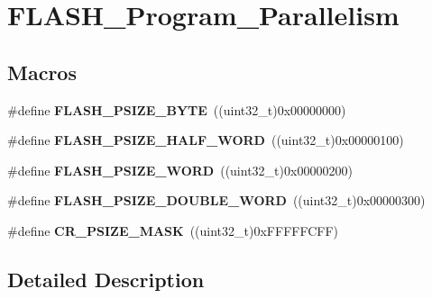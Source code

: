 \hypertarget{group___f_l_a_s_h___program___parallelism}{}\section{F\+L\+A\+S\+H\+\_\+\+Program\+\_\+\+Parallelism}
\label{group___f_l_a_s_h___program___parallelism}
\subsection*{Macros}
\begin{DoxyCompactItemize}
\item 
\hypertarget{group___f_l_a_s_h___program___parallelism_ga83c67710aa697216193654e1e90cc953}{}\#define {\bfseries F\+L\+A\+S\+H\+\_\+\+P\+S\+I\+Z\+E\+\_\+\+B\+Y\+T\+E}~((uint32\+\_\+t)0x00000000)\label{group___f_l_a_s_h___program___parallelism_ga83c67710aa697216193654e1e90cc953}

\item 
\hypertarget{group___f_l_a_s_h___program___parallelism_gad3210ba7423b45cb3063f4294cdeab16}{}\#define {\bfseries F\+L\+A\+S\+H\+\_\+\+P\+S\+I\+Z\+E\+\_\+\+H\+A\+L\+F\+\_\+\+W\+O\+R\+D}~((uint32\+\_\+t)0x00000100)\label{group___f_l_a_s_h___program___parallelism_gad3210ba7423b45cb3063f4294cdeab16}

\item 
\hypertarget{group___f_l_a_s_h___program___parallelism_gac3ac337ed43efc869a9f734527e44673}{}\#define {\bfseries F\+L\+A\+S\+H\+\_\+\+P\+S\+I\+Z\+E\+\_\+\+W\+O\+R\+D}~((uint32\+\_\+t)0x00000200)\label{group___f_l_a_s_h___program___parallelism_gac3ac337ed43efc869a9f734527e44673}

\item 
\hypertarget{group___f_l_a_s_h___program___parallelism_ga0fd17c4e281f199f09a6a6365e9243ee}{}\#define {\bfseries F\+L\+A\+S\+H\+\_\+\+P\+S\+I\+Z\+E\+\_\+\+D\+O\+U\+B\+L\+E\+\_\+\+W\+O\+R\+D}~((uint32\+\_\+t)0x00000300)\label{group___f_l_a_s_h___program___parallelism_ga0fd17c4e281f199f09a6a6365e9243ee}

\item 
\hypertarget{group___f_l_a_s_h___program___parallelism_ga7c755f15e36221021a1438857e40365c}{}\#define {\bfseries C\+R\+\_\+\+P\+S\+I\+Z\+E\+\_\+\+M\+A\+S\+K}~((uint32\+\_\+t)0x\+F\+F\+F\+F\+F\+C\+F\+F)\label{group___f_l_a_s_h___program___parallelism_ga7c755f15e36221021a1438857e40365c}

\end{DoxyCompactItemize}


\subsection{Detailed Description}
